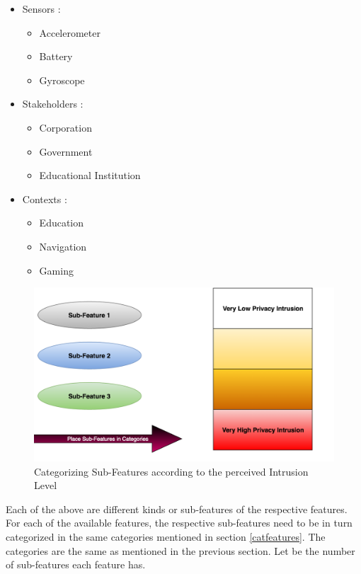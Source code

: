 \begin{itemize}
\item Sensors : 
\begin{itemize}
\item Accelerometer
\item  Battery
\item Gyroscope
\end{itemize} 
\item Stakeholders : 
\begin{itemize}
\item Corporation
\item  Government
\item Educational Institution
\end{itemize}
\item Contexts :
\begin{itemize}
\item Education
\item Navigation
\item Gaming
\end{itemize}
\end{itemize}

\begin{figure}[ht!]
\centering
\includegraphics[width=\textwidth,keepaspectratio]{./images/categorize_sub}
\caption{Categorizing Sub-Features according to the perceived Intrusion Level \label{categorize_sub}}
\end{figure}

Each of the above are different kinds or sub-features of the respective features. 
For each of the available features, the respective sub-features need to be in turn categorized in the same categories mentioned in section \ref{catfeatures}. The categories are the same as mentioned in the previous section. Let \numsubfeatures be the number of sub-features each feature has.

